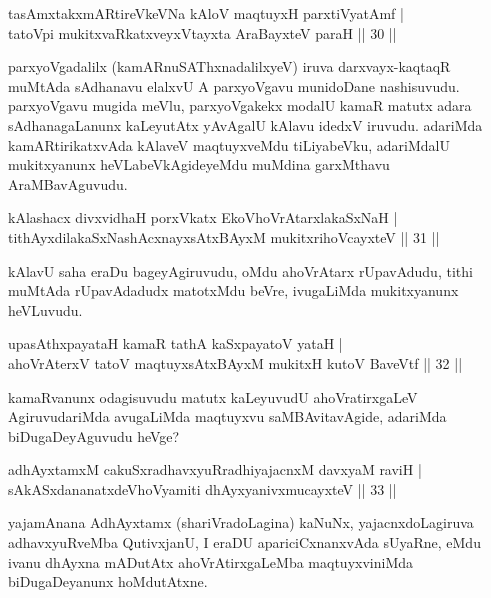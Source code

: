 \begin{shl}
tasAmxtakxmARtireVkeVNa kAloV maqtuyxH parxtiVyatAmf |\\
tatoV\s pi mukitxvaRkatxveyxVtayxta AraBayxteV paraH \hfill || 30 ||
\end{shl}

\begin{artha}
parxyoVgadalilx (kamARnuSAThxnadalilxyeV) iruva darxvayx-kaqtaqR muMtAda sAdhanavu elalxvU A parxyoVgavu munidoDane nashisuvudu. parxyoVgavu mugida meVlu, parxyoVgakekx modalU kamaR matutx adara sAdhanagaLanunx kaLeyutAtx yAvAgalU kAlavu idedxV iruvudu. adariMda kamARtirikatxvAda kAlaveV maqtuyxveMdu tiLiyabeVku, adariMdalU mukitxyanunx heVLabeVkAgideyeMdu muMdina garxMthavu AraMBavAguvudu.
\end{artha}

\begin{shl}
kAlashacx divxvidhaH porxVkatx EkoV\s hoVrAtarxlakaSxNaH |\\
tithAyxdilakaSxNashAcxnayxsAtxBAyxM mukitxrihoVcayxteV \hfill || 31 ||
\end{shl}

\begin{artha}
kAlavU saha eraDu bageyAgiruvudu, oMdu ahoVrAtarx rUpavAdudu, tithi muMtAda rUpavAdadudx matotxMdu beVre, ivugaLiMda mukitxyanunx heVLuvudu.
\end{artha}


\begin{shl}
upasAthxpayataH kamaR tathA kaSxpayatoV yataH |\\
ahoVrAterxV tatoV maqtuyxsAtxBAyxM mukitxH kutoV BaveVtf \hfill || 32 ||
\end{shl}

\begin{artha}
kamaRvanunx odagisuvudu matutx kaLeyuvudU ahoVratirxgaLeV AgiruvudariMda avugaLiMda maqtuyxvu saMBAvitavAgide, adariMda biDugaDeyAguvudu heVge?
\end{artha}


\begin{shl}
adhAyxtamxM cakuSxradhavxyuRradhiyajacnxM davxyaM raviH |\\
sAkASxdananatxdeVhoV\s yamiti dhAyxyanivxmucayxteV \hfill || 33 ||
\end{shl}

\begin{artha}
yajamAnana AdhAyxtamx (shariVradoLagina) kaNuNx, yajacnxdoLagiruva adhavxyuRveMba QutivxjanU, I eraDU apariciCxnanxvAda sUyaRne, eMdu ivanu dhAyxna mADutAtx ahoVrAtirxgaLeMba maqtuyxviniMda biDugaDeyanunx hoMdutAtxne.
\end{artha}

